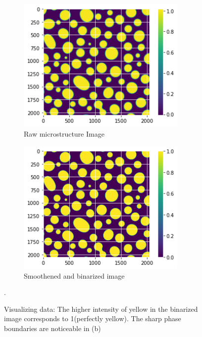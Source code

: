 \documentclass[12pt, a4paper]{report}
\begin{document}
\begin{figure}[H]
\centering
\begin{subfigure}{0.45\textwidth}
  \centering
  \includegraphics[width=0.9\textwidth]{Pictures/DataProcessingNonSmoothened.png}
  \caption{Raw microstructure Image}
  \label{img:microstrImg}
\end{subfigure}
\begin{subfigure}{.45\textwidth}
  \centering
  \includegraphics[width=0.9\textwidth]{Pictures/DataProcessingSmoothened.png}
  \caption{Smoothened and binarized image}
  \label{img:MicrostrImg}
\end{subfigure}
\caption{Visualizing data: The higher intensity of yellow in the binarized image corresponds to 1(perfectly yellow). The sharp phase boundaries are noticeable in (b)}.
\label{fig:test}
\end{figure}
\end{document}
